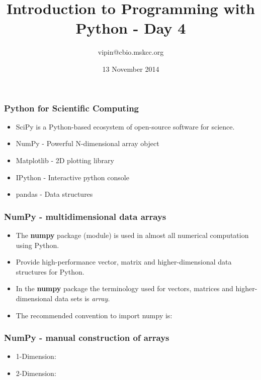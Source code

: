 \documentclass[11pt]{beamer}
\title[pyClass1]{Introduction to Programming with Python - Day 4}
\author{vipin@cbio.mskcc.org}
\institute[cBio@MSKCC]
{
    R{\"a}tsch Laboratory, Computational Biology Center\\
    Memorial Sloan Kettering Cancer Center\\
}
\date{13 November 2014}
\begin{document}
\maketitle
%
\begin{frame}[plain]
    \frametitle{Python for Scientific Computing}
    \begin{itemize}
        \item[] SciPy is a Python-based ecosystem of open-source software for science. 
        \newline 
        \pause 
        \item[] NumPy - Powerful N-dimensional array object 
        \newline
        \pause
        \item[] Matplotlib - 2D plotting library
        \newline
        \pause
        \item[] IPython - Interactive python console
        \newline
        \pause
        \item[] pandas - Data structures
    \end{itemize}
\end{frame}
%
%
\begin{frame}[plain]
    \frametitle{NumPy - multidimensional data arrays}
    \begin{itemize}
        \item[] The \textbf{numpy} package (module) is used in almost all numerical computation using Python.
        \newline
        \pause
        \item[] Provide high-performance vector, matrix and higher-dimensional data structures for Python.
        \newline
        \pause 
        \item[] In the \textbf{numpy} package the terminology used for vectors, matrices and higher-dimensional data sets is \textit{array}.
        \newline
        \pause 
         
         \pause
         \item[] The recommended convention to import numpy is:
        \newline
         \pause
         
    \end{itemize}
\end{frame}
%
\begin{frame}[plain]
    \frametitle{NumPy - manual construction of arrays}
    \begin{itemize}
        \item[] 1-Dimension: 
         
        \pause 
        \item[] 2-Dimension: 
         
    \end{itemize}
\end{frame}
\end{document}
